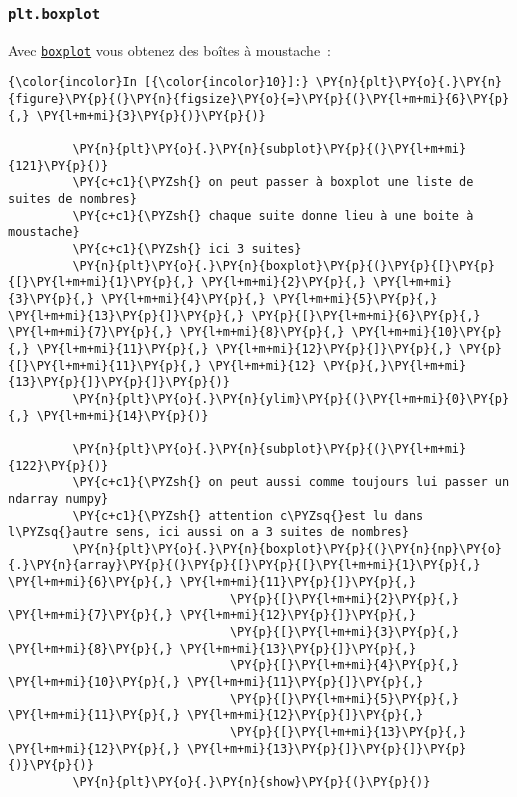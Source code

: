     \hypertarget{plt.boxplot}{%
\subsubsection{\texorpdfstring{\texttt{plt.boxplot}}{plt.boxplot}}\label{plt.boxplot}}

    Avec
\href{https://matplotlib.org/api/_as_gen/matplotlib.pyplot.boxplot.html}{\texttt{boxplot}}
vous obtenez des boîtes à moustache~:

    \begin{Verbatim}[commandchars=\\\{\}]
{\color{incolor}In [{\color{incolor}10}]:} \PY{n}{plt}\PY{o}{.}\PY{n}{figure}\PY{p}{(}\PY{n}{figsize}\PY{o}{=}\PY{p}{(}\PY{l+m+mi}{6}\PY{p}{,} \PY{l+m+mi}{3}\PY{p}{)}\PY{p}{)}
         
         \PY{n}{plt}\PY{o}{.}\PY{n}{subplot}\PY{p}{(}\PY{l+m+mi}{121}\PY{p}{)}
         \PY{c+c1}{\PYZsh{} on peut passer à boxplot une liste de suites de nombres}
         \PY{c+c1}{\PYZsh{} chaque suite donne lieu à une boite à moustache}
         \PY{c+c1}{\PYZsh{} ici 3 suites}
         \PY{n}{plt}\PY{o}{.}\PY{n}{boxplot}\PY{p}{(}\PY{p}{[}\PY{p}{[}\PY{l+m+mi}{1}\PY{p}{,} \PY{l+m+mi}{2}\PY{p}{,} \PY{l+m+mi}{3}\PY{p}{,} \PY{l+m+mi}{4}\PY{p}{,} \PY{l+m+mi}{5}\PY{p}{,} \PY{l+m+mi}{13}\PY{p}{]}\PY{p}{,} \PY{p}{[}\PY{l+m+mi}{6}\PY{p}{,} \PY{l+m+mi}{7}\PY{p}{,} \PY{l+m+mi}{8}\PY{p}{,} \PY{l+m+mi}{10}\PY{p}{,} \PY{l+m+mi}{11}\PY{p}{,} \PY{l+m+mi}{12}\PY{p}{]}\PY{p}{,} \PY{p}{[}\PY{l+m+mi}{11}\PY{p}{,} \PY{l+m+mi}{12} \PY{p}{,}\PY{l+m+mi}{13}\PY{p}{]}\PY{p}{]}\PY{p}{)}
         \PY{n}{plt}\PY{o}{.}\PY{n}{ylim}\PY{p}{(}\PY{l+m+mi}{0}\PY{p}{,} \PY{l+m+mi}{14}\PY{p}{)}
         
         \PY{n}{plt}\PY{o}{.}\PY{n}{subplot}\PY{p}{(}\PY{l+m+mi}{122}\PY{p}{)}
         \PY{c+c1}{\PYZsh{} on peut aussi comme toujours lui passer un ndarray numpy}
         \PY{c+c1}{\PYZsh{} attention c\PYZsq{}est lu dans l\PYZsq{}autre sens, ici aussi on a 3 suites de nombres}
         \PY{n}{plt}\PY{o}{.}\PY{n}{boxplot}\PY{p}{(}\PY{n}{np}\PY{o}{.}\PY{n}{array}\PY{p}{(}\PY{p}{[}\PY{p}{[}\PY{l+m+mi}{1}\PY{p}{,} \PY{l+m+mi}{6}\PY{p}{,} \PY{l+m+mi}{11}\PY{p}{]}\PY{p}{,}
                               \PY{p}{[}\PY{l+m+mi}{2}\PY{p}{,} \PY{l+m+mi}{7}\PY{p}{,} \PY{l+m+mi}{12}\PY{p}{]}\PY{p}{,}
                               \PY{p}{[}\PY{l+m+mi}{3}\PY{p}{,} \PY{l+m+mi}{8}\PY{p}{,} \PY{l+m+mi}{13}\PY{p}{]}\PY{p}{,}
                               \PY{p}{[}\PY{l+m+mi}{4}\PY{p}{,} \PY{l+m+mi}{10}\PY{p}{,} \PY{l+m+mi}{11}\PY{p}{]}\PY{p}{,}
                               \PY{p}{[}\PY{l+m+mi}{5}\PY{p}{,} \PY{l+m+mi}{11}\PY{p}{,} \PY{l+m+mi}{12}\PY{p}{]}\PY{p}{,}
                               \PY{p}{[}\PY{l+m+mi}{13}\PY{p}{,} \PY{l+m+mi}{12}\PY{p}{,} \PY{l+m+mi}{13}\PY{p}{]}\PY{p}{]}\PY{p}{)}\PY{p}{)}
         \PY{n}{plt}\PY{o}{.}\PY{n}{show}\PY{p}{(}\PY{p}{)}
\end{Verbatim}


    \begin{center}
    \end{center}
    { \hspace*{\fill} \\}
    

    
    
    
